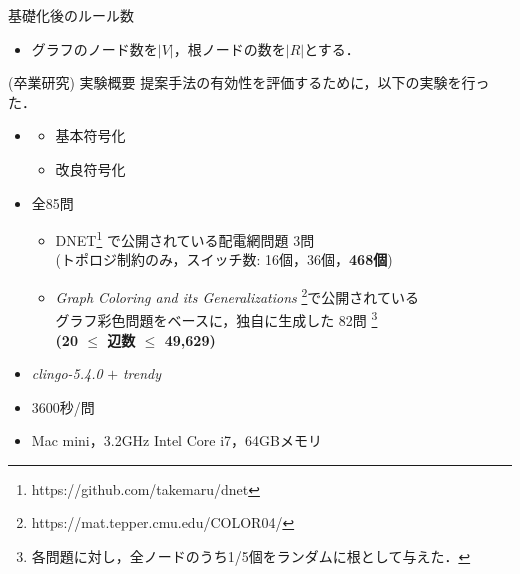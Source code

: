\begin{frame}{基礎化後のルール数}
  \begin{itemize}
  \item グラフのノード数を$|V|$，根ノードの数を$|R|$とする．
  \end{itemize}
  \begin{table}[t]
    \centering
    
  \end{table}
\end{frame}

\begin{frame}{(卒業研究) 実験概要}
  \renewcommand{\thefootnote}{\fnsymbol{footnote}}
  \setcounter{footnote}{1}
  提案手法の有効性を評価するために，以下の実験を行った．
  \begin{itemize}
  \item {}
    \begin{itemize}
    \item 基本符号化
    \item 改良符号化
    \end{itemize}
  \item {} 全85問
    \begin{itemize}
    \item DNET\footnote{https://github.com/takemaru/dnet}%
      で公開されている配電網問題 3問 \\ (トポロジ制約のみ，スイッチ数:
      16個，36個，\alert{\bf 468個})
    \item \textit{Graph Coloring and its Generalizations}
      \footnote{https://mat.tepper.cmu.edu/COLOR04/}で公開されている \\
      グラフ彩色問題をベースに，独自に生成した 82問 
      \footnote{各問題に対し，全ノードのうち1/5個をランダムに根として与えた．}\\
      \alert{\bf (20 $\leq$ 辺数 $\leq$ 49,629)}
    \end{itemize}
  \item {} \textit{clingo-5.4.0} $+$ \textit{trendy}
  \item {} 3600秒/問
  \item {} Mac mini，3.2GHz Intel Core i7，64GBメモリ
  \end{itemize}
\end{frame}
